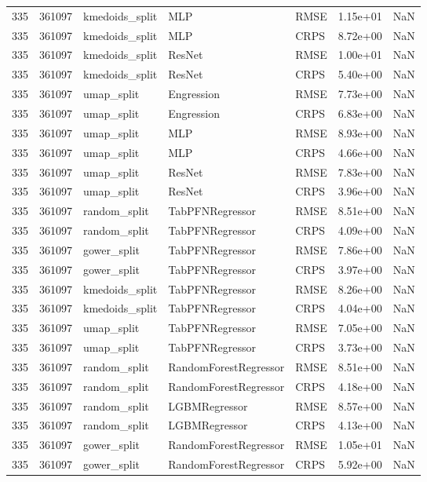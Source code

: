 \begin{tabular}{rrlllrr}
335 & 361097 & kmedoids\_split & MLP & RMSE & 1.15e+01 & NaN \\
335 & 361097 & kmedoids\_split & MLP & CRPS & 8.72e+00 & NaN \\
335 & 361097 & kmedoids\_split & ResNet & RMSE & 1.00e+01 & NaN \\
335 & 361097 & kmedoids\_split & ResNet & CRPS & 5.40e+00 & NaN \\
335 & 361097 & umap\_split & Engression & RMSE & 7.73e+00 & NaN \\
335 & 361097 & umap\_split & Engression & CRPS & 6.83e+00 & NaN \\
335 & 361097 & umap\_split & MLP & RMSE & 8.93e+00 & NaN \\
335 & 361097 & umap\_split & MLP & CRPS & 4.66e+00 & NaN \\
335 & 361097 & umap\_split & ResNet & RMSE & 7.83e+00 & NaN \\
335 & 361097 & umap\_split & ResNet & CRPS & 3.96e+00 & NaN \\
335 & 361097 & random\_split & TabPFNRegressor & RMSE & 8.51e+00 & NaN \\
335 & 361097 & random\_split & TabPFNRegressor & CRPS & 4.09e+00 & NaN \\
335 & 361097 & gower\_split & TabPFNRegressor & RMSE & 7.86e+00 & NaN \\
335 & 361097 & gower\_split & TabPFNRegressor & CRPS & 3.97e+00 & NaN \\
335 & 361097 & kmedoids\_split & TabPFNRegressor & RMSE & 8.26e+00 & NaN \\
335 & 361097 & kmedoids\_split & TabPFNRegressor & CRPS & 4.04e+00 & NaN \\
335 & 361097 & umap\_split & TabPFNRegressor & RMSE & 7.05e+00 & NaN \\
335 & 361097 & umap\_split & TabPFNRegressor & CRPS & 3.73e+00 & NaN \\
335 & 361097 & random\_split & RandomForestRegressor & RMSE & 8.51e+00 & NaN \\
335 & 361097 & random\_split & RandomForestRegressor & CRPS & 4.18e+00 & NaN \\
335 & 361097 & random\_split & LGBMRegressor & RMSE & 8.57e+00 & NaN \\
335 & 361097 & random\_split & LGBMRegressor & CRPS & 4.13e+00 & NaN \\
335 & 361097 & gower\_split & RandomForestRegressor & RMSE & 1.05e+01 & NaN \\
335 & 361097 & gower\_split & RandomForestRegressor & CRPS & 5.92e+00 & NaN \\

\end{tabular}

